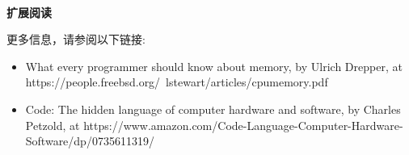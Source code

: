 \noindent\textbf{}\ \par
\textbf{扩展阅读} \ \par
更多信息，请参阅以下链接: \par

\begin{itemize}
	\item What every programmer should know about memory, by Ulrich Drepper, at  https:/​/​people.​freebsd.​org/​~lstewart/​articles/​cpumemory.​pdf
	\item Code: The hidden language of computer hardware and software, by Charles Petzold, at  https:/​/​www.​amazon.​com/​Code-​Language-​Computer-​Hardware-	Software/​dp/​0735611319/​
\end{itemize}

\newpage



